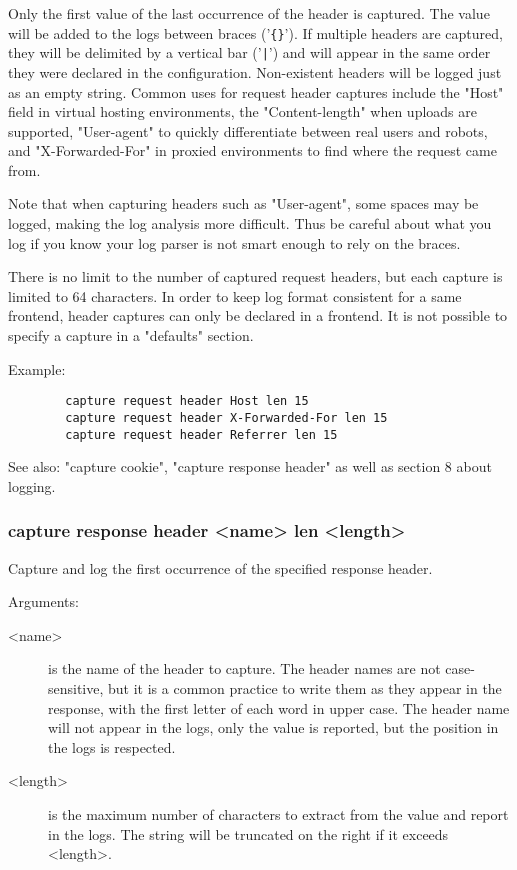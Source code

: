   Only the first value of the last occurrence of the header is captured. The
  value will be added to the logs between braces ('\verb|{}|'). If multiple headers
  are captured, they will be delimited by a vertical bar ('\verb:|:') and will appear
  in the same order they were declared in the configuration. Non-existent
  headers will be logged just as an empty string. Common uses for request
  header captures include the "Host" field in virtual hosting environments, the
  "Content-length" when uploads are supported, "User-agent" to quickly
  differentiate between real users and robots, and "X-Forwarded-For" in proxied
  environments to find where the request came from.

  Note that when capturing headers such as "User-agent", some spaces may be
  logged, making the log analysis more difficult. Thus be careful about what
  you log if you know your log parser is not smart enough to rely on the
  braces.

  There is no limit to the number of captured request headers, but each capture
  is limited to 64 characters. In order to keep log format consistent for a
  same frontend, header captures can only be declared in a frontend. It is not
  possible to specify a capture in a "defaults" section.

  Example:
  \begin{verbatim}
        capture request header Host len 15
        capture request header X-Forwarded-For len 15
        capture request header Referrer len 15
  \end{verbatim}

  See also: "capture cookie", "capture response header" as well as section 8
             about logging.

\subsubsection[capture response header]{capture response header <name> len <length>}
  Capture and log the first occurrence of the specified response header.
  

  Arguments:
  \begin{description}
  \item[<name>]    is the name of the header to capture. The header names are not
              case-sensitive, but it is a common practice to write them as they
              appear in the response, with the first letter of each word in
              upper case. The header name will not appear in the logs, only the
              value is reported, but the position in the logs is respected.

  \item[<length>]  is the maximum number of characters to extract from the value and
              report in the logs. The string will be truncated on the right if
              it exceeds <length>.
  \end{description}

